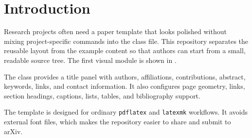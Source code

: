 \section{Introduction}

Research projects often need a paper template that looks polished without
mixing project-specific commands into the class file. This repository separates
the reusable layout from the example content so that authors can start from a
small, readable source tree. The first visual module is shown in
.

The class provides a title panel with authors, affiliations, contributions,
abstract, keywords, links, and contact information. It also configures page
geometry, links, section headings, captions, lists, tables, and bibliography
support.

The template is designed for ordinary \texttt{pdflatex} and \texttt{latexmk}
workflows. It avoids external font files, which makes the repository easier to
share and submit to arXiv.


